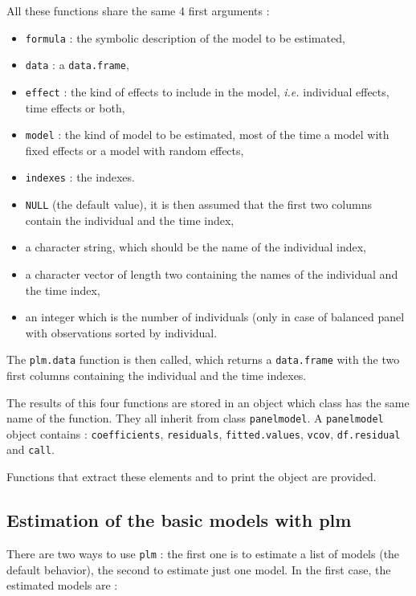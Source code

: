 \documentclass[a4paper]{article}
\begin{document}
All these functions share the same 4 first arguments :

\begin{itemize}
\item \texttt{formula} : the symbolic description of the model to be estimated,
\item \texttt{data} : a \texttt{data.frame},
\item \texttt{effect} : the kind of effects to include in the model,
  \emph{i.e.} individual effects, time effects or both,
\item \texttt{model} : the kind of model to be estimated, most of the
time a model with fixed effects or a model with random effects,
\item \texttt{indexes} : the indexes.
\end{itemize}


\begin{itemize}
\item \texttt{NULL} (the default value), it is then assumed
  that the first two columns contain the individual and the time
  index,
\item a character string, which should be the name of the individual
  index,
\item a character vector of length two containing the names of the
  individual and the time index,
\item an integer which is the number of individuals (only in case of
  balanced panel with observations sorted by individual.
\end{itemize}

The \texttt{plm.data} function is then called, which returns a
\texttt{data.frame} with the two first columns containing the
individual and the time indexes.

The results of this four functions are stored in an object which class has the
same name of the function. They all inherit from class \texttt{panelmodel}. A
\texttt{panelmodel} object contains : \texttt{coefficients},
\texttt{residuals}, \texttt{fitted.values}, \texttt{vcov},
\texttt{df.residual} and \texttt{call}.

Functions that extract these elements and to print the object are provided.

\subsection{Estimation of the basic models with plm}

There are two ways to use \texttt{plm} : the first one is to estimate
a list of models (the default behavior), the second to estimate just one model.
In the first case, the estimated models are :
\end{document}

